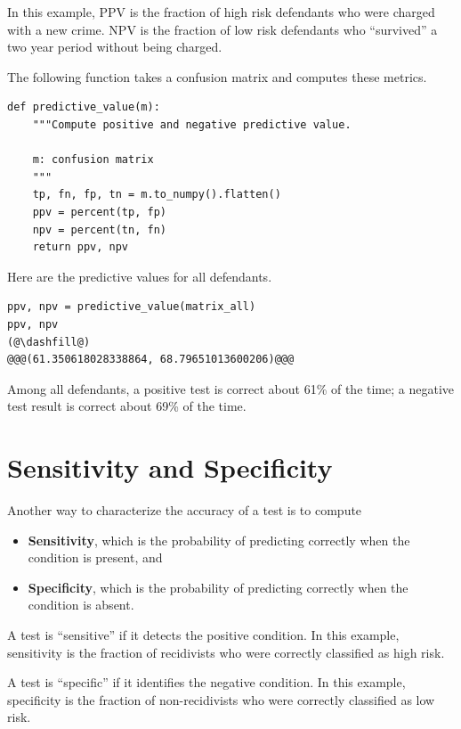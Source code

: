 In this example, PPV is the fraction of high risk defendants who were
charged with a new crime. NPV is the fraction of low risk defendants who
``survived'' a two year period without being charged.

The following function takes a confusion matrix and computes these
metrics.

\begin{lstlisting}[]
def predictive_value(m):
    """Compute positive and negative predictive value.
    
    m: confusion matrix
    """
    tp, fn, fp, tn = m.to_numpy().flatten()
    ppv = percent(tp, fp)
    npv = percent(tn, fn)
    return ppv, npv
\end{lstlisting}

Here are the predictive values for all defendants.

\begin{lstlisting}[]
ppv, npv = predictive_value(matrix_all)
ppv, npv
(@\dashfill@)
@@@(61.350618028338864, 68.79651013600206)@@@
\end{lstlisting}

Among all defendants, a positive test is correct about 61\% of the time;
a negative test result is correct about 69\% of the time.

\hypertarget{sensitivity-and-specificity}{%
\section{Sensitivity and
Specificity}\label{sensitivity-and-specificity}}

Another way to characterize the accuracy of a test is to compute

\begin{itemize}
\item
  \textbf{Sensitivity}, which is the probability of predicting correctly
  when the condition is present, and
\item
  \textbf{Specificity}, which is the probability of predicting correctly
  when the condition is absent.
\end{itemize}

A test is ``sensitive'' if it detects the positive condition. In this
example, sensitivity is the fraction of recidivists who were correctly
classified as high risk.

A test is ``specific'' if it identifies the negative condition. In this
example, specificity is the fraction of non-recidivists who were
correctly classified as low risk.


